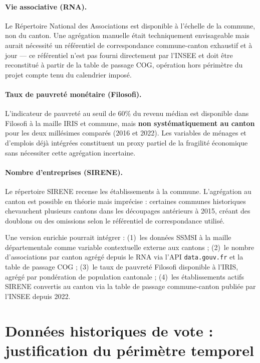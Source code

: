 \paragraph{Vie associative (RNA).}
Le Répertoire National des Associations est disponible à l'échelle de la commune,
non du canton. Une agrégation manuelle était techniquement envisageable mais aurait
nécessité un référentiel de correspondance commune-canton exhaustif et à jour ---
ce référentiel n'est pas fourni directement par l'INSEE et doit être reconstitué
à partir de la table de passage COG, opération hors périmètre du projet compte tenu
du calendrier imposé.

\paragraph{Taux de pauvreté monétaire (Filosofi).}
L'indicateur de pauvreté au seuil de 60\% du revenu médian est disponible dans
Filosofi à la maille IRIS et commune, mais \textbf{non systématiquement au canton}
pour les deux millésimes comparés (2016 et 2022). Les variables de ménages et
d'emplois déjà intégrées constituent un proxy partiel de la fragilité économique
sans nécessiter cette agrégation incertaine.

\paragraph{Nombre d'entreprises (SIRENE).}
Le répertoire SIRENE recense les établissements à la commune. L'agrégation au canton
est possible en théorie mais imprécise : certaines communes historiques chevauchent
plusieurs cantons dans les découpages antérieurs à 2015, créant des doublons ou
des omissions selon le référentiel de correspondance utilisé.

\begin{warnbox}
Une version enrichie pourrait intégrer : (1)~les données SSMSI à la maille
départementale comme variable contextuelle externe aux cantons ;
(2)~le nombre d'associations par canton agrégé depuis le RNA via l'API
\texttt{data.gouv.fr} et la table de passage COG ;
(3)~le taux de pauvreté Filosofi disponible à l'IRIS, agrégé par pondération
de population cantonale ;
(4)~les établissements actifs SIRENE convertis au canton via la table de passage
commune-canton publiée par l'INSEE depuis 2022.
\end{warnbox}

\section{Données historiques de vote : justification du périmètre temporel}
\label{sec:vote_historique}

